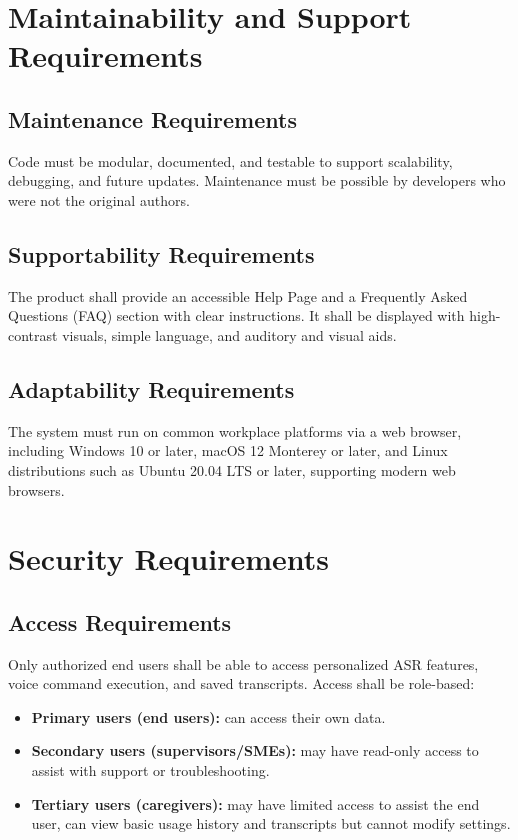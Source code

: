 \documentclass[11pt]{article}
\begin{document}
\section{Maintainability and Support Requirements}
\subsection{Maintenance Requirements}
Code must be modular, documented, and testable to support scalability, debugging, and future updates. Maintenance must be possible by developers who were not the original authors. 
\subsection{Supportability Requirements}
The product shall provide an accessible Help Page and a Frequently Asked Questions (FAQ) section with clear instructions. It shall be displayed with high-contrast visuals, simple language, and auditory and visual aids. 
\subsection{Adaptability Requirements}
The system must run on common workplace platforms via a web browser, including Windows 10 or later, macOS 12 Monterey or later, and Linux distributions such as Ubuntu 20.04 LTS or later, supporting modern web browsers.

\section{Security Requirements}
\subsection{Access Requirements}
Only authorized end users shall be able to access personalized ASR features, voice command execution, and saved transcripts. Access shall be role-based:

\begin{itemize}
    \item \textbf{Primary users (end users):} can access their own data.
    \item \textbf{Secondary users (supervisors/SMEs):} may have read-only access to assist with support or troubleshooting.
    \item \textbf{Tertiary users (caregivers):} may have limited access to assist the end user, can view basic usage history and transcripts but cannot modify settings.
\end{itemize}
\end{document}
